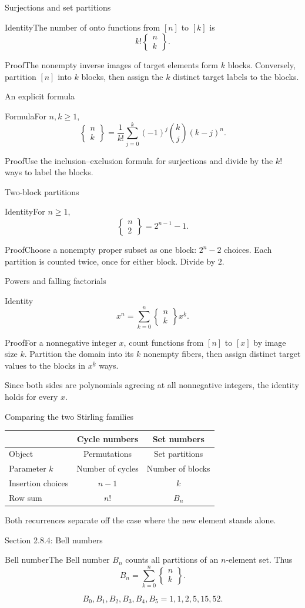 \documentclass[aspectratio=169,11pt]{beamer}
\newcommand{\Def}[2]{\begin{block}{#1}#2\end{block}}
\newcommand{\Thm}[2]{\begin{block}{#1}#2\end{block}}
\renewcommand{\Proof}[1]{\begin{block}{Proof}\normalsize #1\end{block}}
\newcommand{\fall}[2]{#1^{\underline{#2}}}
\newcommand{\stir}[2]{\left\{\begin{matrix}#1\\#2\end{matrix}\right\}}
\newcommand{\gap}{\par\medskip}
\begin{document}
\begin{frame}{Surjections and set partitions}
\large
\Thm{Identity}{The number of onto functions from $[n]$ to $[k]$ is
\[k!\stir nk.\]}
\Proof{The nonempty inverse images of target elements form $k$ blocks. Conversely, partition $[n]$ into $k$ blocks, then assign the $k$ distinct target labels to the blocks.}
\end{frame}
\begin{frame}{An explicit formula}
\large
\Thm{Formula}{For $n,k\geq1$,
\[\stir nk=\frac1{k!}\sum_{j=0}^k(-1)^j\binom kj(k-j)^n.\]}
\Proof{Use the inclusion--exclusion formula for surjections and divide by the $k!$ ways to label the blocks.}
\end{frame}
\begin{frame}{Two-block partitions}
\large
\Thm{Identity}{For $n\geq1$,
\[\stir n2=2^{n-1}-1.\]}
\Proof{Choose a nonempty proper subset as one block: $2^n-2$ choices. Each partition is counted twice, once for either block. Divide by $2$.}
\end{frame}
\begin{frame}{Powers and falling factorials}
\large
\Thm{Identity}{\[x^n=\sum_{k=0}^n\stir nk\fall xk.\]}
\Proof{For a nonnegative integer $x$, count functions from $[n]$ to $[x]$ by image size $k$. Partition the domain into its $k$ nonempty fibers, then assign distinct target values to the blocks in $\fall xk$ ways.\gap Since both sides are polynomials agreeing at all nonnegative integers, the identity holds for every $x$.}
\end{frame}
\begin{frame}{Comparing the two Stirling families}
\large
\begin{center}\renewcommand{\arraystretch}{1.7}
\begin{tabular}{lcc}
& Cycle numbers & Set numbers\\\hline
Object & Permutations & Set partitions\\
Parameter $k$ & Number of cycles & Number of blocks\\
Insertion choices & $n-1$ & $k$\\
Row sum & $n!$ & $B_n$
\end{tabular}\end{center}
\gap Both recurrences separate off the case where the new element stands alone.
\end{frame}
\begin{frame}{Section 2.8.4: Bell numbers}
\large
\Def{Bell number}{The Bell number $B_n$ counts all partitions of an $n$-element set. Thus
\[B_n=\sum_{k=0}^n\stir nk.\]}
\[B_0,B_1,B_2,B_3,B_4,B_5=1,1,2,5,15,52.\]
\end{frame}
\end{document}
